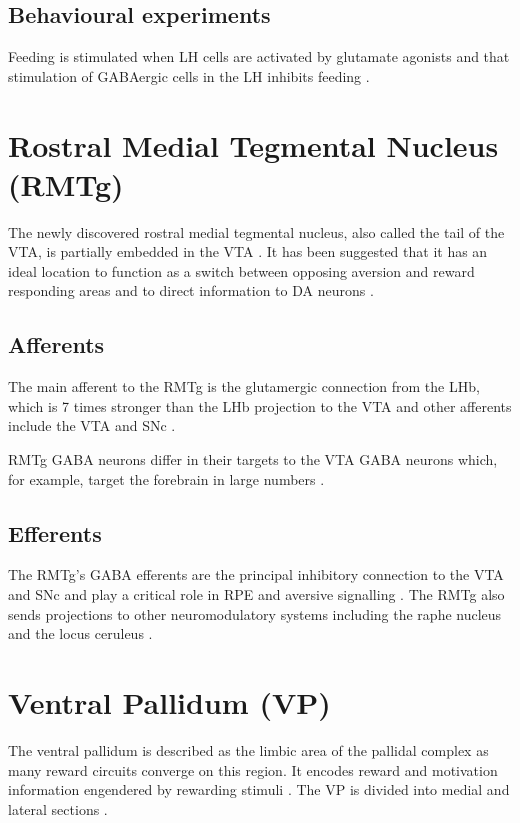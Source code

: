 \documentclass[12pt,a4paper]{article}
\begin{document}
\subsection{Behavioural experiments}
Feeding is stimulated when LH cells are activated by glutamate
agonists \citep{stanley93} and that stimulation of GABAergic cells in
the LH inhibits feeding \citep{Stanley2011}.






\section{Rostral Medial Tegmental Nucleus (RMTg) }
The newly discovered rostral medial tegmental nucleus, also called the
tail of the VTA, is partially embedded in the VTA
\citep{Bourdy2012}. It has been suggested that it has an ideal
location to function as a switch between opposing aversion and reward
responding areas and to direct information to DA neurons
\citep{Barrot2012}.

\subsection{Afferents}
The main afferent to the RMTg is the glutamergic connection from the
LHb, which is 7 times stronger than the LHb projection to the VTA
\citep{Barrot2012} and other afferents include the VTA and SNc
\citep{Lavezzi2011}.

RMTg GABA neurons differ in their targets to the VTA GABA neurons
which, for example, target the forebrain in large numbers
\citep{Barrot2012}.

\subsection{Efferents}
The RMTg’s GABA efferents are the principal inhibitory connection to
the VTA and SNc and play a critical role in RPE and aversive
signalling \citep{Bourdy2012}. The RMTg also sends projections to
other neuromodulatory systems including the raphe nucleus and the
locus ceruleus \citep{Barrot2012} \citep{Hong2011}.






\section{Ventral Pallidum (VP)}
The ventral pallidum is described as the limbic area of the pallidal complex as
many reward circuits converge on this region. It encodes reward and motivation
information engendered by rewarding stimuli \citep{Smith2009}. The VP is divided into medial
and lateral sections \citep{Sesack2010}.
\end{document}

